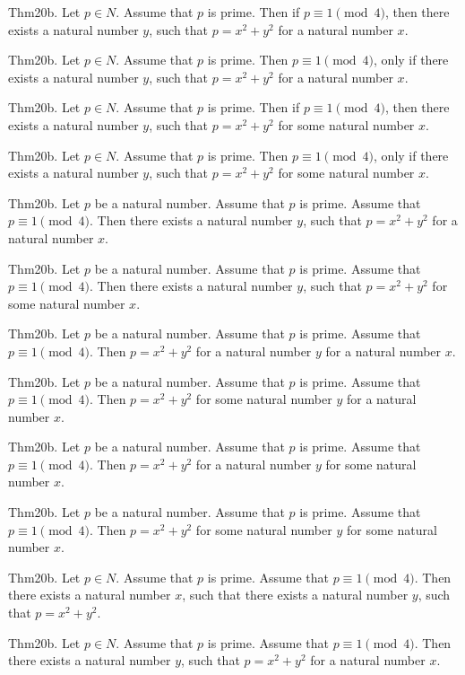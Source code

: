 \documentclass{article}
\begin{document}
Thm20b. Let $p \in N$. Assume that $p$ is prime. Then if $p \equiv 1 \pmod{ 4}$, then there exists a natural number $y$, such that $p = x ^{ 2}+ y ^{ 2}$ for a natural number $x$.

Thm20b. Let $p \in N$. Assume that $p$ is prime. Then $p \equiv 1 \pmod{ 4}$, only if there exists a natural number $y$, such that $p = x ^{ 2}+ y ^{ 2}$ for a natural number $x$.

Thm20b. Let $p \in N$. Assume that $p$ is prime. Then if $p \equiv 1 \pmod{ 4}$, then there exists a natural number $y$, such that $p = x ^{ 2}+ y ^{ 2}$ for some natural number $x$.

Thm20b. Let $p \in N$. Assume that $p$ is prime. Then $p \equiv 1 \pmod{ 4}$, only if there exists a natural number $y$, such that $p = x ^{ 2}+ y ^{ 2}$ for some natural number $x$.

Thm20b. Let $p$ be a natural number. Assume that $p$ is prime. Assume that $p \equiv 1 \pmod{ 4}$. Then there exists a natural number $y$, such that $p = x ^{ 2}+ y ^{ 2}$ for a natural number $x$.

Thm20b. Let $p$ be a natural number. Assume that $p$ is prime. Assume that $p \equiv 1 \pmod{ 4}$. Then there exists a natural number $y$, such that $p = x ^{ 2}+ y ^{ 2}$ for some natural number $x$.

Thm20b. Let $p$ be a natural number. Assume that $p$ is prime. Assume that $p \equiv 1 \pmod{ 4}$. Then $p = x ^{ 2}+ y ^{ 2}$ for a natural number $y$ for a natural number $x$.

Thm20b. Let $p$ be a natural number. Assume that $p$ is prime. Assume that $p \equiv 1 \pmod{ 4}$. Then $p = x ^{ 2}+ y ^{ 2}$ for some natural number $y$ for a natural number $x$.

Thm20b. Let $p$ be a natural number. Assume that $p$ is prime. Assume that $p \equiv 1 \pmod{ 4}$. Then $p = x ^{ 2}+ y ^{ 2}$ for a natural number $y$ for some natural number $x$.

Thm20b. Let $p$ be a natural number. Assume that $p$ is prime. Assume that $p \equiv 1 \pmod{ 4}$. Then $p = x ^{ 2}+ y ^{ 2}$ for some natural number $y$ for some natural number $x$.

Thm20b. Let $p \in N$. Assume that $p$ is prime. Assume that $p \equiv 1 \pmod{ 4}$. Then there exists a natural number $x$, such that there exists a natural number $y$, such that $p = x ^{ 2}+ y ^{ 2}$.

Thm20b. Let $p \in N$. Assume that $p$ is prime. Assume that $p \equiv 1 \pmod{ 4}$. Then there exists a natural number $y$, such that $p = x ^{ 2}+ y ^{ 2}$ for a natural number $x$.
\end{document}
